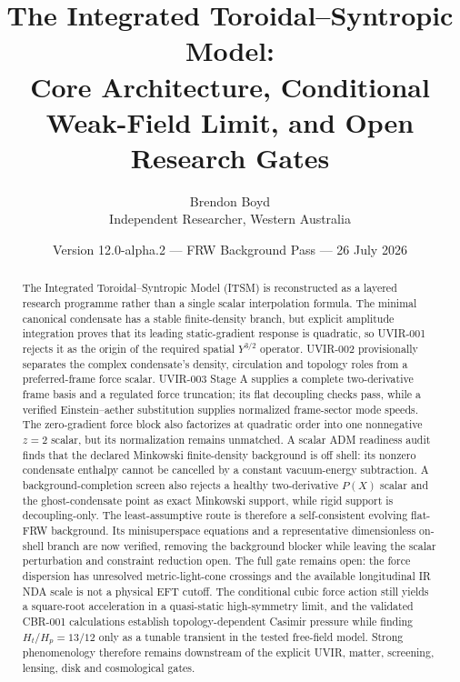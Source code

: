 \documentclass[11pt]{article}
\title{The Integrated Toroidal--Syntropic Model:\\
Core Architecture, Conditional Weak-Field Limit, and Open Research Gates}
\author{Brendon Boyd\\Independent Researcher, Western Australia}
\date{Version 12.0-alpha.2 --- FRW Background Pass --- 26 July 2026}
\begin{document}
\maketitle

\begin{center}
\end{center}

\begin{abstract}
The Integrated Toroidal--Syntropic Model (ITSM) is reconstructed as a layered
research programme rather than a single scalar interpolation formula.  The
minimal canonical condensate has a stable finite-density branch, but explicit
amplitude integration proves that its leading static-gradient response is
quadratic, so UVIR-001 rejects it as the origin of the required spatial
$Y^{3/2}$ operator.  UVIR-002 provisionally separates the complex condensate's
density, circulation and topology roles from a preferred-frame force scalar.
UVIR-003 Stage A supplies a complete two-derivative frame basis and a regulated
force truncation; its flat decoupling checks pass, while a verified
Einstein--aether substitution supplies normalized frame-sector mode speeds.
The zero-gradient force block also factorizes at quadratic order into one
nonnegative $z=2$ scalar, but its normalization remains unmatched.  A scalar
ADM readiness audit finds that the declared Minkowski finite-density
background is off shell: its nonzero condensate enthalpy cannot be cancelled
by a constant vacuum-energy subtraction.  A background-completion screen also
rejects a healthy two-derivative $P(X)$ scalar and the ghost-condensate point
as exact Minkowski support, while rigid support is decoupling-only.  The
least-assumptive route is therefore a self-consistent evolving flat-FRW
background.  Its minisuperspace equations and a representative dimensionless
on-shell branch are now verified, removing the background blocker while
leaving the scalar perturbation and constraint reduction open.
The full gate remains open: the force dispersion has unresolved
metric-light-cone crossings and the available longitudinal IR NDA scale is
not a physical EFT cutoff.  The conditional cubic force action still yields a
square-root acceleration in a quasi-static high-symmetry limit, and the
validated CBR-001 calculations establish topology-dependent Casimir pressure
while finding $H_t/H_p=13/12$ only as a tunable transient in the tested
free-field model.  Strong phenomenology therefore remains downstream of the
explicit UVIR, matter, screening, lensing, disk and cosmological gates.
\end{abstract}
\end{document}
